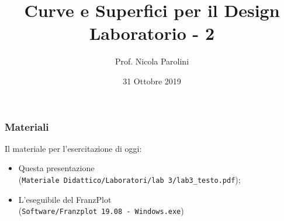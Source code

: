 \documentclass{beamer}
\title[Curve e Sup. - Lab 3]{Curve e Superfici per il Design \\ Laboratorio - 2}
\author[Prof. Parolini]{Prof. Nicola Parolini}
\date{31 Ottobre 2019}
\newcommand{\frnzplt}{FranzPlot }
\begin{document}
\begin{frame}
\maketitle
\end{frame}

\begin{frame}
\frametitle{Materiali}
Il materiale per l'esercitazione di oggi:
\begin{itemize}
\item Questa presentazione \\ (\texttt{Materiale Didattico/Laboratori/lab 3/lab3\_testo.pdf});
\item L'eseguibile del \frnzplt \\ (\texttt{Software/Franzplot 19.08 - Windows.exe})
\end{itemize}
\end{frame}


\end{document}
